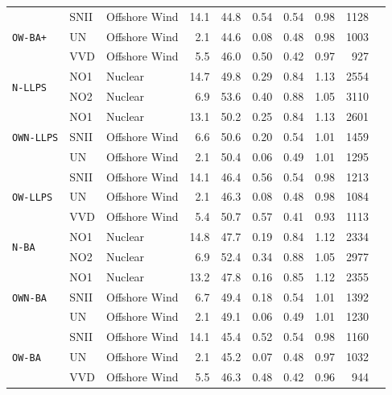 \begin{table}[htbp]
\begin{tabular}{lllrrrrrrr}
\midrule
\multirow{3}{*}{\texttt{OW-BA+}} & SNII & Offshore Wind & 14.1 & 44.8 & 0.54 & 0.54 & 0.98 & 1128 \\
 & UN & Offshore Wind & 2.1 & 44.6 & 0.08 & 0.48 & 0.98 & 1003 \\
 & VVD & Offshore Wind & 5.5 & 46.0 & 0.50 & 0.42 & 0.97 & 927 \\
\midrule
\multirow{2}{*}{\texttt{N-LLPS}} & NO1 & Nuclear & 14.7 & 49.8 & 0.29 & 0.84 & 1.13 & 2554 \\
 & NO2 & Nuclear & 6.9 & 53.6 & 0.40 & 0.88 & 1.05 & 3110 \\
\midrule
\multirow{3}{*}{\texttt{OWN-LLPS}} & NO1 & Nuclear & 13.1 & 50.2 & 0.25 & 0.84 & 1.13 & 2601 \\
 & SNII & Offshore Wind & 6.6 & 50.6 & 0.20 & 0.54 & 1.01 & 1459 \\
 & UN & Offshore Wind & 2.1 & 50.4 & 0.06 & 0.49 & 1.01 & 1295 \\
\midrule
\multirow{3}{*}{\texttt{OW-LLPS}} & SNII & Offshore Wind & 14.1 & 46.4 & 0.56 & 0.54 & 0.98 & 1213 \\
 & UN & Offshore Wind & 2.1 & 46.3 & 0.08 & 0.48 & 0.98 & 1084 \\
 & VVD & Offshore Wind & 5.4 & 50.7 & 0.57 & 0.41 & 0.93 & 1113 \\
\midrule
\multirow{2}{*}{\texttt{N-BA}} & NO1 & Nuclear & 14.8 & 47.7 & 0.19 & 0.84 & 1.12 & 2334 \\
 & NO2 & Nuclear & 6.9 & 52.4 & 0.34 & 0.88 & 1.05 & 2977 \\
\midrule
\multirow{3}{*}{\texttt{OWN-BA}} & NO1 & Nuclear & 13.2 & 47.8 & 0.16 & 0.85 & 1.12 & 2355 \\
 & SNII & Offshore Wind & 6.7 & 49.4 & 0.18 & 0.54 & 1.01 & 1392 \\
 & UN & Offshore Wind & 2.1 & 49.1 & 0.06 & 0.49 & 1.01 & 1230 \\
\midrule
\multirow{3}{*}{\texttt{OW-BA}} & SNII & Offshore Wind & 14.1 & 45.4 & 0.52 & 0.54 & 0.98 & 1160 \\
 & UN & Offshore Wind & 2.1 & 45.2 & 0.07 & 0.48 & 0.97 & 1032 \\
 & VVD & Offshore Wind & 5.5 & 46.3 & 0.48 & 0.42 & 0.96 & 944 \\
\bottomrule
\end{tabular}
\end{table}